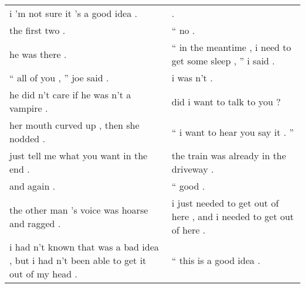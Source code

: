 \documentclass{article}
\begin{document}
\begin{table}[!h]
\begin{center}
{\begin{small}
\begin{tabular}{ll}
                                                   i 'm not sure it 's a good idea .                               &                                                                                   .                                        \\
                                                               the first two .                                     &                                                                               `` no .                                      \\
                                                                he was there .                                     &                                        `` in the meantime , i need to get some sleep , '' i said .                         \\
                                                      `` all of you , '' joe said .                                &                                                                            i was n't .                                     \\
                                            he did n't care if he was n't a vampire .                              &                                                                did i want to talk to you ?                                 \\
                                            her mouth curved up , then she nodded .                                &                                                            `` i want to hear you say it . ''                               \\
                                             just tell me what you want in the end .                               &                                                    the train was already in the driveway .                                 \\
                                                                  and again .                                      &                                                                             `` good .                                      \\
                                      the other man 's voice was hoarse and ragged .                               &                                 i just needed to get out of here , and i needed to get out of here .                       \\
          i had n't known that was a bad idea , but i had n't been able to get it out of my head .                 &                                                                  `` this is a good idea .                                  \\

\end{tabular}
\end{small}}
\end{center}
\end{table}
\end{document}
